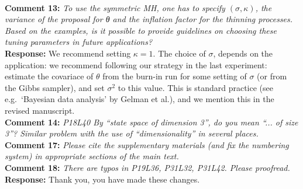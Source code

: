 \documentclass[11pt]{article}
\newcommand{\rev}[2]{\textbf{Comment #1: }\emph{#2}}
\newcommand{\resp}{\textbf{Response: }}
\begin{document}
~\\ 
\rev{13}{To use the symmetric MH, one has to specify $(\sigma, \kappa)$, the variance of the proposal for θ and the inflation factor for the thinning processes. Based on the examples, is it possible to provide guidelines on choosing these tuning parameters in future applications?} 
\\ 
\resp{We recommend setting $\kappa = 1$. The choice of $\sigma$, depends on the application: we recommend following our strategy in the last experiment: estimate the covariace of $\theta$ from the burn-in run for some setting of $\sigma$ (or from the Gibbs sampler), and set $\sigma^2$ to this  value. This is standard practice (see e.g.\ `Bayesian data analysis' by Gelman et al.), and we mention this in the revised manuscript.}
~\\

\noindent \rev{14}{P18L40 By “state space of dimension 3”, do you mean “... of size 3”? Similar problem with the use of “dimensionality” in several places.} \\
\noindent \rev{17}{Please cite the supplementary materials (and fix the numbering system) in appropriate sections of the main text.} \\
\noindent \rev{18}{There are typos in P19L36, P31L32, P31L42. Please proofread.}\\
\resp{Thank you, you have made these changes.}
\end{document}
